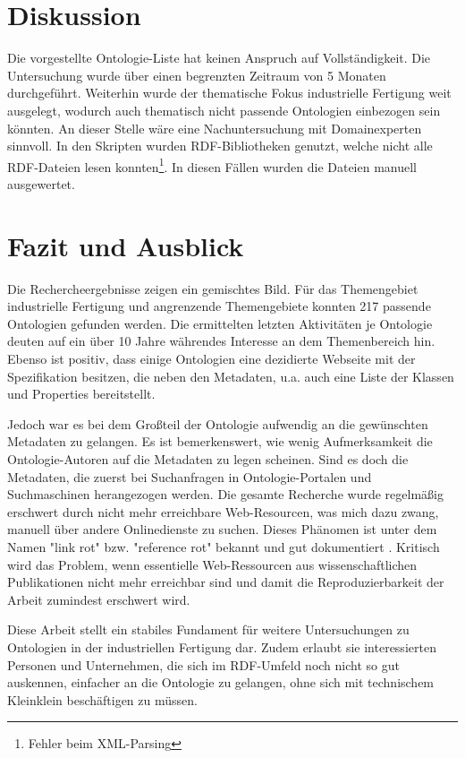 \documentclass{article}
\begin{document}
\section{Diskussion}

Die vorgestellte Ontologie-Liste hat keinen Anspruch auf Vollständigkeit.
Die Untersuchung wurde über einen begrenzten Zeitraum von 5 Monaten durchgeführt.
Weiterhin wurde der thematische Fokus industrielle Fertigung weit ausgelegt, wodurch auch thematisch nicht passende Ontologien einbezogen sein könnten.
An dieser Stelle wäre eine Nachuntersuchung mit Domainexperten sinnvoll.
In den Skripten wurden RDF-Bibliotheken genutzt, welche nicht alle RDF-Dateien lesen konnten\footnote{Fehler beim XML-Parsing}.
In diesen Fällen wurden die Dateien manuell ausgewertet.

\section{Fazit und Ausblick}

Die Rechercheergebnisse zeigen ein gemischtes Bild.
Für das Themengebiet industrielle Fertigung und angrenzende Themengebiete konnten 217 passende Ontologien gefunden werden.
Die ermittelten letzten Aktivitäten je Ontologie deuten auf ein über 10 Jahre währendes Interesse an dem Themenbereich hin.
Ebenso ist positiv, dass einige Ontologien eine dezidierte Webseite mit der Spezifikation besitzen, die neben den Metadaten, u.a. auch eine Liste der Klassen und Properties bereitstellt.

Jedoch war es bei dem Großteil der Ontologie aufwendig an die gewünschten Metadaten zu gelangen.
Es ist bemerkenswert, wie wenig Aufmerksamkeit die Ontologie-Autoren auf die Metadaten zu legen scheinen.
Sind es doch die Metadaten, die zuerst bei Suchanfragen in Ontologie-Portalen und Suchmaschinen herangezogen werden.
Die gesamte Recherche wurde regelmäßig erschwert durch nicht mehr erreichbare Web-Resourcen, was mich dazu zwang, manuell über andere Onlinedienste zu suchen.
Dieses Phänomen ist unter dem Namen "link rot" bzw. "reference rot" bekannt und gut dokumentiert \cite{lakic2023link} \cite{frey2020dbpedia}.
Kritisch wird das Problem, wenn essentielle Web-Ressourcen aus wissenschaftlichen Publikationen nicht mehr erreichbar sind und damit die Reproduzierbarkeit der Arbeit zumindest erschwert wird.

Diese Arbeit stellt ein stabiles Fundament für weitere Untersuchungen zu Ontologien in der industriellen Fertigung dar. Zudem erlaubt sie interessierten Personen und Unternehmen, die sich im RDF-Umfeld noch nicht so gut auskennen, einfacher an die Ontologie zu gelangen, ohne sich mit technischem Kleinklein beschäftigen zu müssen.
\end{document}
